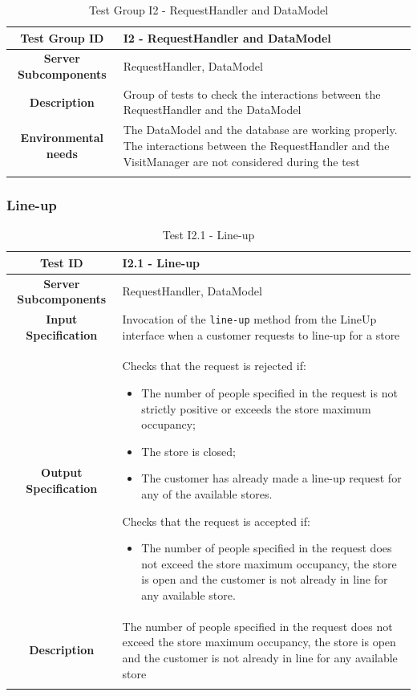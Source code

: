 \documentclass[a4paper,oneside,11pt]{book}
\begin{document}
    \begin{longtable}[c]{|>{\bfseries{}}c|H{.5\textwidth}|}
        \hline
        Test Group ID & I2 - RequestHandler and DataModel \\ \hline
        Server Subcomponents & RequestHandler, DataModel \\ \hline
        Description & Group of tests to check the interactions between the RequestHandler and the DataModel \\ \hline
        Environmental needs & The DataModel and the database are working properly. The interactions between the RequestHandler and the VisitManager are not considered during the test \\ \hline
        \caption{Test Group I2 - RequestHandler and DataModel}
        \label{table:test_I2}
    \end{longtable}
    
    \newpage
    \subsubsection{Line-up}
    \begin{longtable}[c]{|>{\bfseries{}}c|H{.5\textwidth}|}
        \hline
        Test ID & I2.1 - Line-up \\ \hline
        Server Subcomponents & RequestHandler, DataModel \\ \hline
        Input Specification & Invocation of the \texttt{line-up} method from the LineUp interface when a customer requests to line-up for a store \\ \hline
        Output Specification & Checks that the request is rejected if:
        \begin{itemize}
            \item The number of people specified in the request is not strictly positive or exceeds the store maximum occupancy;
            \item The store is closed;
            \item The customer has already made a line-up request for any of the available stores.
        \end{itemize}
        Checks that the request is accepted if:
        \begin{itemize}
            \item The number of people specified in the request  does not exceed the store maximum occupancy, the store is open and the customer is not already in line for any available store.
        \end{itemize} \\ \hline
        Description & The number of people specified in the request does not exceed the store maximum occupancy, the store is open and the customer is not already in line for any available store \\ \hline
        \caption{Test I2.1 - Line-up}
        \label{table:test_I2.1}
    \end{longtable}
    
\end{document}
